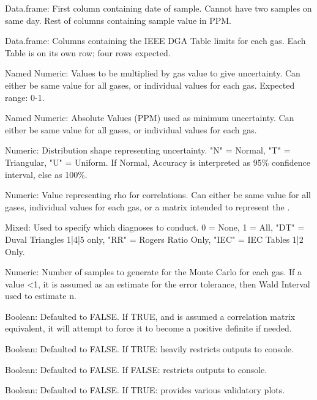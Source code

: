 \documentclass[a4paper]{book}
\begin{document}
\begin{Arguments}
\begin{ldescription}
\item[\code{gas\_data}] Data.frame: First column containing date of sample. Cannot have two samples on same day. Rest of columns containing sample value in PPM.

\item[\code{limit\_data}] Data.frame: Columns containing the IEEE DGA Table limits for each gas. Each Table is on its own row; four rows expected.

\item[\code{accuracy}] Named Numeric: Values to be multiplied by gas value to give uncertainty. Can either be same value for all gases, or individual values for each gas. Expected range: 0-1.

\item[\code{min\_accuracy}] Named Numeric: Absolute Values (PPM) used as minimum uncertainty. Can either be same value for all gases, or individual values for each gas.

\item[\code{distribution\_shape}] Numeric: Distribution shape representing uncertainty. "N" = Normal, "T" = Triangular, "U" = Uniform. If Normal, Accuracy is interpreted as 95\% confidence interval, else as 100\%.

\item[\code{rho}] Numeric: Value representing rho for correlations. Can either be same value for all gases, individual values for each gas, or a matrix intended to represent the .

\item[\code{diagnosis}] Mixed: Used to specify which diagnoses to conduct. 0 = None, 1 = All, "DT" = Duval Triangles 1|4|5 only, "RR" = Rogers Ratio Only, "IEC" = IEC Tables 1|2 Only.

\item[\code{n}] Numeric: Number of samples to generate for the Monte Carlo for each gas. If a value <1, it is assumed as an estimate for the error tolerance, then Wald Interval used to estimate n.

\item[\code{flex}] Boolean: Defaulted to FALSE. If TRUE, and  is assumed a correlation matrix equivalent, it will attempt to force it to become a positive definite if needed.

\item[\code{silent}] Boolean: Defaulted to FALSE. If TRUE: heavily restricts outputs to console.

\item[\code{verbose}] Boolean: Defaulted to FALSE. If FALSE: restricts outputs to console.

\item[\code{validate}] Boolean: Defaulted to FALSE. If TRUE: provides various validatory plots.
\end{ldescription}
\end{Arguments}
\end{document}
